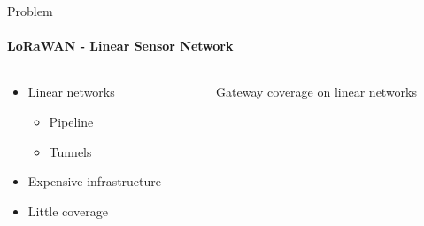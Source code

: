 \begin{frame}{Problem}
\framesubtitle{LoRaWAN - Linear Sensor Network}
\begin{columns}
\begin{column}{0.4\textwidth}
\begin{itemize}
    \item Linear networks
    \begin{itemize}
        \item Pipeline
        \item Tunnels
    \end{itemize}
    \item Expensive infrastructure
    \item Little coverage
\end{itemize}
\end{column}
\begin{column}{0.6\textwidth}

\begin{figure}[H]
    \centering
    \caption{Gateway coverage on linear networks\label{fig:lsn}}
\end{figure}

\end{column}
\end{columns}
\end{frame}

